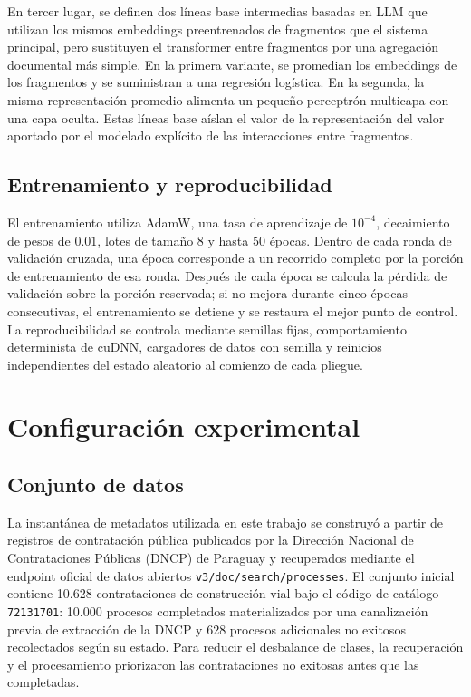 En tercer lugar, se definen dos líneas base intermedias basadas en LLM que utilizan los mismos embeddings preentrenados de fragmentos que el sistema principal, pero sustituyen el transformer entre fragmentos por una agregación documental más simple. En la primera variante, se promedian los embeddings de los fragmentos y se suministran a una regresión logística. En la segunda, la misma representación promedio alimenta un pequeño perceptrón multicapa con una capa oculta. Estas líneas base aíslan el valor de la representación del valor aportado por el modelado explícito de las interacciones entre fragmentos.

\section{Entrenamiento y reproducibilidad}
El entrenamiento utiliza AdamW, una tasa de aprendizaje de $10^{-4}$, decaimiento de pesos de $0.01$, lotes de tamaño $8$ y hasta $50$ épocas. Dentro de cada ronda de validación cruzada, una época corresponde a un recorrido completo por la porción de entrenamiento de esa ronda. Después de cada época se calcula la pérdida de validación sobre la porción reservada; si no mejora durante cinco épocas consecutivas, el entrenamiento se detiene y se restaura el mejor punto de control. La reproducibilidad se controla mediante semillas fijas, comportamiento determinista de cuDNN, cargadores de datos con semilla y reinicios independientes del estado aleatorio al comienzo de cada pliegue.

\chapter{Configuración experimental}
\section{Conjunto de datos}
La instantánea de metadatos utilizada en este trabajo se construyó a partir de registros de contratación pública publicados por la Dirección Nacional de Contrataciones Públicas (DNCP) de Paraguay y recuperados mediante el endpoint oficial de datos abiertos \texttt{v3/doc/search/processes}. El conjunto inicial contiene 10.628 contrataciones de construcción vial bajo el código de catálogo \texttt{72131701}: 10.000 procesos completados materializados por una canalización previa de extracción de la DNCP y 628 procesos adicionales no exitosos recolectados según su estado. Para reducir el desbalance de clases, la recuperación y el procesamiento priorizaron las contrataciones no exitosas antes que las completadas.

